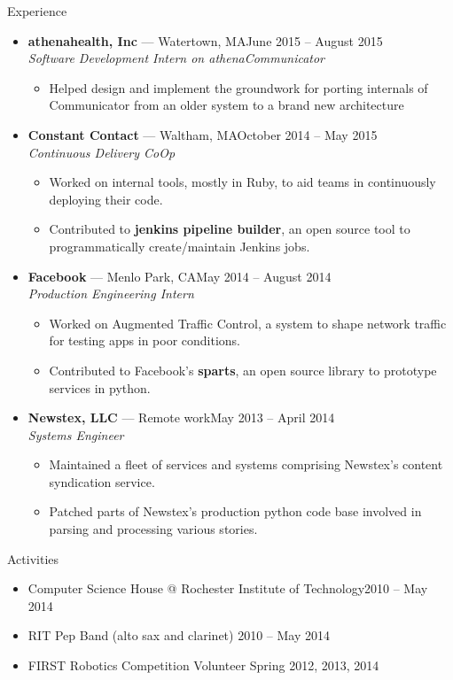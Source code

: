 \documentclass[10pt,oneside]{article}
\newenvironment{ressection}[1]{
	\vspace{3pt}
	{\fontfamily{bch}\selectfont\Large#1}
	\begin{itemize}
	\vspace{2pt}
}{
	\end{itemize}
}
\newcommand{\resitem}[1]{
	\vspace{-2pt}
	\item \begin{flushleft} #1 \end{flushleft}
}
\newcommand{\ressubitem}[1]{
	\vspace{-1pt}
	\item \begin{flushleft} #1 \end{flushleft}
}
\newcommand{\resbigitem}[3]{
	\vspace{-3pt}
	\item
	\textbf{#1} --- #2 \\
	\textit{#3}
}
\newenvironment{ressubsec}[3]{
	\resbigitem{#1}{#2}{#3}
	\vspace{-1pt}
	\begin{itemize}
}{
	\end{itemize}
}
\begin{document}
\begin{ressection}{Experience}

	\begin{ressubsec}{athenahealth, Inc}{Watertown, MA\hfill June 2015 -- August 2015}{Software Development Intern on athenaCommunicator}
		\ressubitem{Helped design and implement the groundwork for porting internals of Communicator from an older system to a brand new architecture}
	\end{ressubsec}
	\begin{ressubsec}{Constant Contact}{Waltham, MA\hfill October 2014 -- May 2015}{Continuous Delivery CoOp}
		\ressubitem{Worked on internal tools, mostly in Ruby, to aid teams in continuously deploying their code.}
		\ressubitem{Contributed to \textbf{jenkins pipeline builder}, an open source tool to programmatically create/maintain Jenkins jobs.}
	\end{ressubsec}
	\begin{ressubsec}{Facebook}{Menlo Park, CA\hfill May 2014 -- August 2014}{Production Engineering Intern}
		\ressubitem{Worked on Augmented Traffic Control, a system to shape network traffic for testing apps in poor conditions.}
		\ressubitem{Contributed to Facebook's \textbf{sparts}, an open source library to prototype services in python.}
	\end{ressubsec}
	\begin{ressubsec}{Newstex, LLC}{Remote work\hfill May 2013 -- April 2014}{Systems Engineer}
		\ressubitem{Maintained a fleet of services and systems comprising Newstex's content syndication service.}
		\ressubitem{Patched parts of Newstex's production python code base involved in parsing and processing various stories.}
	\end{ressubsec}

\end{ressection}


\begin{ressection}{Activities}

	\resitem{Computer Science House @ Rochester Institute of Technology\hfill 2010 -- May 2014}
	\resitem{RIT Pep Band (alto sax and clarinet) \hfill 2010 -- May 2014}
	\resitem{FIRST Robotics Competition Volunteer \hfill Spring 2012, 2013, 2014}

\end{ressection}
\end{document}

